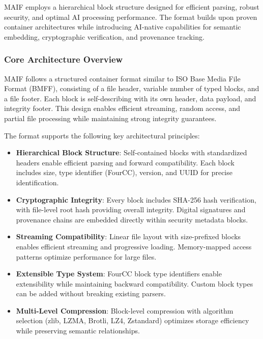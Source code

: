 \documentclass[conference]{IEEEtran}
\begin{document}
MAIF employs a hierarchical block structure designed for efficient parsing, robust security, and optimal AI processing performance. The format builds upon proven container architectures while introducing AI-native capabilities for semantic embedding, cryptographic verification, and provenance tracking.

\subsubsection{Core Architecture Overview}

MAIF follows a structured container format similar to ISO Base Media File Format (BMFF), consisting of a file header, variable number of typed blocks, and a file footer. Each block is self-describing with its own header, data payload, and integrity footer. This design enables efficient streaming, random access, and partial file processing while maintaining strong integrity guarantees.

The format supports the following key architectural principles:

\begin{itemize}[leftmargin=*]
\item \textbf{Hierarchical Block Structure}: Self-contained blocks with standardized headers enable efficient parsing and forward compatibility. Each block includes size, type identifier (FourCC), version, and UUID for precise identification.

\item \textbf{Cryptographic Integrity}: Every block includes SHA-256 hash verification, with file-level root hash providing overall integrity. Digital signatures and provenance chains are embedded directly within security metadata blocks.

\item \textbf{Streaming Compatibility}: Linear file layout with size-prefixed blocks enables efficient streaming and progressive loading. Memory-mapped access patterns optimize performance for large files.

\item \textbf{Extensible Type System}: FourCC block type identifiers enable extensibility while maintaining backward compatibility. Custom block types can be added without breaking existing parsers.

\item \textbf{Multi-Level Compression}: Block-level compression with algorithm selection (zlib, LZMA, Brotli, LZ4, Zstandard) optimizes storage efficiency while preserving semantic relationships.
\end{itemize}
\end{document}
